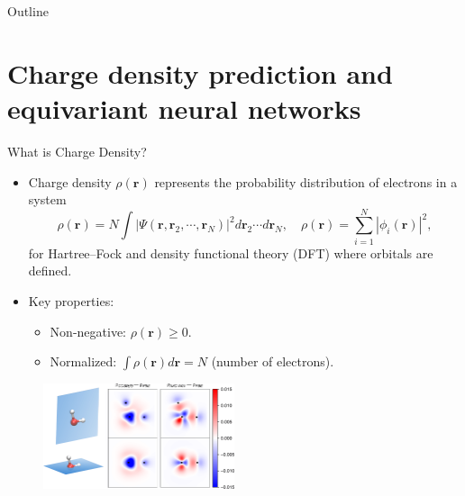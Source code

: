 \begin{frame}
    \titlepage
\end{frame}

\begin{frame}{Outline}
    \tableofcontents
\end{frame}

\section{Charge density prediction and equivariant neural networks}

\begin{frame}{What is Charge Density?}
    \begin{itemize}
        \item Charge density $\rho(\mathbf{r})$ represents the probability distribution
        of electrons in a system
        \begin{equation*}
            \rho(\mathbf{r}) = N\int |\Psi(\mathbf{r}, \mathbf{r}_2, \cdots, \mathbf{r}_N)|^2
            d\mathbf{r}_2 \cdots d\mathbf{r}_N,
            \quad \rho(\mathbf{r}) = \sum_{i=1}^N |\phi_i(\mathbf{r})|^2,
        \end{equation*}
        for Hartree–Fock and density functional theory (DFT) where orbitals are defined.
        \item Key properties:
        \begin{itemize}
            \item Non-negative: $\rho(\mathbf{r}) \geq 0$.
            \item Normalized: $\int \rho(\mathbf{r}) d\mathbf{r} = N$ (number of electrons).
        \end{itemize}
    \end{itemize}
    \begin{figure}
        \includegraphics[width=0.5\textwidth]{figures/water_electron_density.png}
    \end{figure}
\end{frame}

